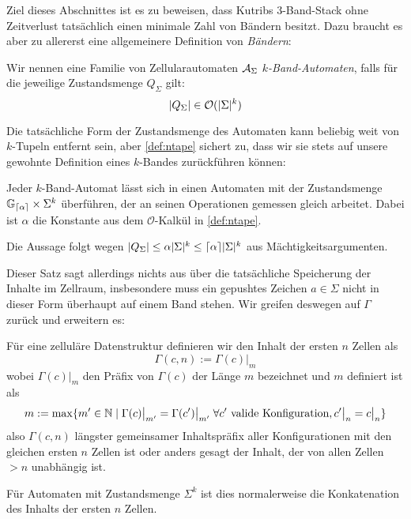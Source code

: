 \documentclass{article}
\begin{document}
Ziel dieses Abschnittes ist es zu beweisen, dass Kutribs 3-Band-Stack ohne Zeitverlust tatsächlich einen minimale Zahl von Bändern besitzt. Dazu braucht es aber zu allererst eine allgemeinere Definition von \emph{Bändern}:
\begin{definition}
    Wir nennen eine Familie von Zellularautomaten $\mathcal{A}_\Sigma$ \emph{$k$-Band-Automaten}, falls für die jeweilige Zustandsmenge $Q_\Sigma$ gilt:
    \begin{equation}
        \lvert Q_\Sigma\rvert \in \mathcal{O}(\lvert\Sigma\rvert^k) \label{def:ntape}
    \end{equation}
\end{definition}

Die tatsächliche Form der Zustandsmenge des Automaten kann beliebig weit von $k$-Tupeln entfernt sein, aber \eqref{def:ntape} sichert zu, dass wir sie stets auf unsere gewohnte Definition eines $k$-Bandes zurückführen können:

\begin{satz}
    \label{thm:tape-hom}
    Jeder $k$-Band-Automat lässt sich in einen Automaten mit der Zustandsmenge $\mathbb{G}_{\lceil\alpha\rceil} \times \Sigma^k$ überführen, der an seinen Operationen gemessen gleich arbeitet. Dabei ist $\alpha$ die Konstante aus dem $\mathcal{O}$-Kalkül in \eqref{def:ntape}.

    \begin{beweis}
        Die Aussage folgt wegen $\lvert Q_\Sigma\rvert \leq \alpha \lvert\Sigma\rvert^k \leq \lceil\alpha\rceil \lvert\Sigma\rvert^k$ aus Mächtigkeitsargumenten.
    \end{beweis}
\end{satz}

Dieser Satz sagt allerdings nichts aus über die tatsächliche Speicherung der Inhalte im Zellraum, insbesondere muss ein gepushtes Zeichen $a \in \Sigma$ nicht in dieser Form überhaupt auf einem Band stehen. Wir greifen deswegen auf $\Gamma$ zurück und erweitern es:

\begin{definition}
    Für eine zelluläre Datenstruktur definieren wir den Inhalt der ersten $n$ Zellen als
    \[ \Gamma(c,n) := \Gamma(c) \big|_m \]
    wobei $\Gamma(c) \big|_m$ den Präfix von $\Gamma(c)$ der Länge $m$ bezeichnet und $m$ definiert ist als
    \[ m := \max \{m' \in \mathbb{N} \mid \Gamma(c) \big|_{m'} = \Gamma(c') \big|_{m'} \;\forall c' \text{ valide Konfiguration}, c' \big|_n = c \big|_n \} \]
    also $\Gamma(c,n)$ längster gemeinsamer Inhaltspräfix aller Konfigurationen mit den gleichen ersten $n$ Zellen ist oder anders gesagt der Inhalt, der von allen Zellen $> n$ unabhängig ist.

    Für Automaten mit Zustandsmenge $\Sigma^k$ ist dies normalerweise die Konkatenation des Inhalts der ersten $n$ Zellen.
\end{definition}
\end{document}
